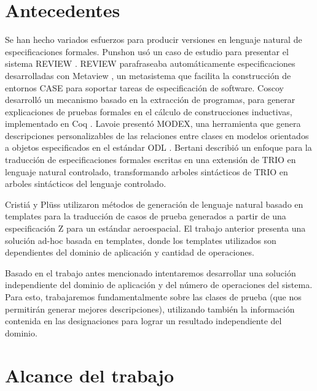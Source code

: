 \section{Antecedentes}

Se han hecho variados esfuerzos para producir versiones en lenguaje natural de especificaciones formales. Punshon \cite{punshon} usó un caso de estudio para presentar el sistema REVIEW \cite{review}. REVIEW parafraseaba automáticamente especificaciones desarrolladas con Metaview \cite{metaview}, un metasistema que facilita la construcción de entornos CASE para soportar tareas de especificación de software. Coscoy \cite{coscoy} desarrolló un mecanismo basado en la extracción de programas, para generar explicaciones de pruebas formales en el cálculo de construcciones inductivas, implementado en Coq \cite{coq}. Lavoie \cite{lavoie} presentó MODEX, una herramienta que genera descripciones personalizables de las relaciones entre clases en modelos orientados a objetos especificados en el estándar ODL \cite{odl}. Bertani \cite{bertani} describió un enfoque para la traducción de especificaciones formales escritas en una extensión de TRIO \cite{trio} en lenguaje natural controlado, transformando arboles sintácticos de TRIO en arboles sintácticos del lenguaje controlado.  

Cristiá y Plüss \cite{cristia_pluss} utilizaron métodos de generación de lenguaje natural basado en templates para la traducción de casos de prueba generados a partir de una especificación Z para un estándar aeroespacial. El trabajo anterior presenta una solución ad-hoc basada en templates, donde los templates utilizados son dependientes del dominio de aplicación y cantidad de operaciones. 


Basado en el trabajo antes mencionado intentaremos desarrollar una solución independiente del dominio de aplicación y del número de operaciones del sistema. Para esto, trabajaremos fundamentalmente sobre las clases de prueba (que nos permitirán generar mejores descripciones), utilizando también la información contenida en las designaciones para lograr un resultado independiente del dominio.

\section{Alcance del trabajo}

